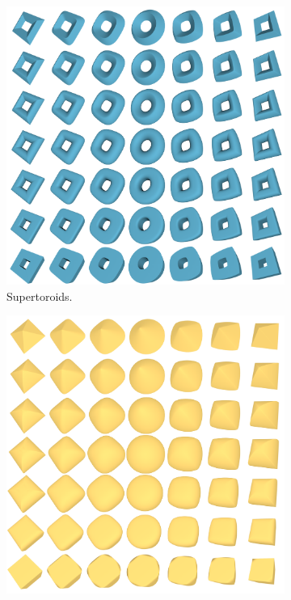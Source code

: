 \begin{figure}[t]
  \centering
  \begin{subfigure}[t]{0.48\linewidth}
    \centering
    \includegraphics[width=\linewidth]{figs/topogen/toroids_overview.png}
    \caption{Supertoroids.}
    \label{fig:toroids-overview}
  \end{subfigure}
  \hfill
  \begin{subfigure}[t]{0.48\linewidth}
    \centering
    \includegraphics[width=\linewidth]{figs/topogen/ellipsoids_overview.png}

\end{subfigure}
\end{figure}
